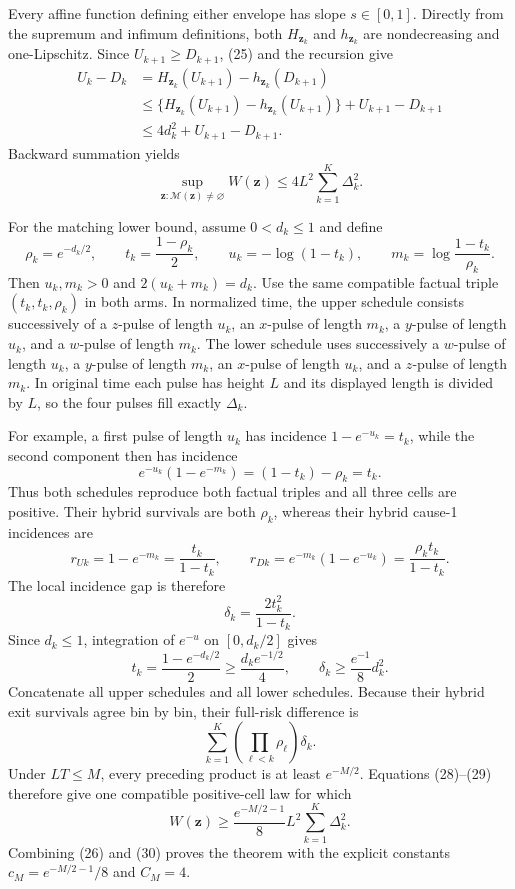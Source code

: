 Every affine function defining either envelope has slope \(s\in[0,1]\).  Directly from the supremum and infimum definitions, both \(H_{\mathbf z_k}\) and \(h_{\mathbf z_k}\) are nondecreasing and one-Lipschitz.  Since \(U_{k+1}\ge D_{k+1}\), (25) and the recursion give
\[
\begin{aligned}
 U_k-D_k
 &=H_{\mathbf z_k}(U_{k+1})-h_{\mathbf z_k}(D_{k+1})\\
 &\le \{H_{\mathbf z_k}(U_{k+1})-h_{\mathbf z_k}(U_{k+1})\}
      +U_{k+1}-D_{k+1}\\
 &\le4d_k^2+U_{k+1}-D_{k+1}.
\end{aligned}
\]
Backward summation yields
\[
 \sup_{\mathbf z:\mathcal M(\mathbf z)\ne\varnothing}W(\mathbf z)
 \le4L^2\sum_{k=1}^K\Delta_k^2.                            \tag{26}
\]

For the matching lower bound, assume \(0<d_k\le1\) and define
\[
 \rho_k=e^{-d_k/2},\quad\quad t_k=\frac{1-\rho_k}{2},\quad\quad
 u_k=-\log(1-t_k),\quad\quad m_k=\log\frac{1-t_k}{\rho_k}.     \tag{27}
\]
Then \(u_k,m_k>0\) and \(2(u_k+m_k)=d_k\).  Use the same compatible factual triple \((t_k,t_k,\rho_k)\) in both arms.  In normalized time, the upper schedule consists successively of a \(z\)-pulse of length \(u_k\), an \(x\)-pulse of length \(m_k\), a \(y\)-pulse of length \(u_k\), and a \(w\)-pulse of length \(m_k\).  The lower schedule uses successively a \(w\)-pulse of length \(u_k\), a \(y\)-pulse of length \(m_k\), an \(x\)-pulse of length \(u_k\), and a \(z\)-pulse of length \(m_k\).  In original time each pulse has height \(L\) and its displayed length is divided by \(L\), so the four pulses fill exactly \(\Delta_k\).

For example, a first pulse of length \(u_k\) has incidence \(1-e^{-u_k}=t_k\), while the second component then has incidence
\[
 e^{-u_k}(1-e^{-m_k})=(1-t_k)-\rho_k=t_k.
\]
Thus both schedules reproduce both factual triples and all three cells are positive.  Their hybrid survivals are both \(\rho_k\), whereas their hybrid cause-1 incidences are
\[
 r_{Uk}=1-e^{-m_k}=\frac{t_k}{1-t_k},
 \quad\quad
 r_{Dk}=e^{-m_k}(1-e^{-u_k})=\frac{\rho_k t_k}{1-t_k}.
\]
The local incidence gap is therefore
\[
 \delta_k=\frac{2t_k^2}{1-t_k}.                             \tag{28}
\]
Since \(d_k\le1\), integration of \(e^{-u}\) on \([0,d_k/2]\) gives
\[
 t_k=\frac{1-e^{-d_k/2}}2\ge\frac{d_ke^{-1/2}}4,
 \quad\quad \delta_k\ge\frac{e^{-1}}8d_k^2.                   \tag{29}
\]
Concatenate all upper schedules and all lower schedules.  Because their hybrid exit survivals agree bin by bin, their full-risk difference is
\[
 \sum_{k=1}^K\left(\prod_{\ell<k}\rho_\ell\right)\delta_k.
\]
Under \(LT\le M\), every preceding product is at least \(e^{-M/2}\).  Equations (28)--(29) therefore give one compatible positive-cell law for which
\[
 W(\mathbf z)\ge \frac{e^{-M/2-1}}8L^2\sum_{k=1}^K\Delta_k^2.  \tag{30}
\]
Combining (26) and (30) proves the theorem with the explicit constants \(c_M=e^{-M/2-1}/8\) and \(C_M=4\).

